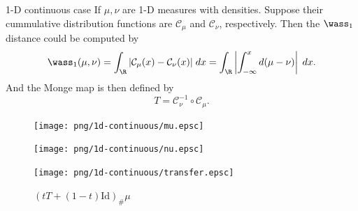 \begin{frame}{1-D continuous case}
    \footnotesize
    \vspace{-.5em}
    If $\mu,\nu$ are 1-D measures with densities. Suppose their 
    cummulative distribution functions are $\mathcal{C}_\mu$ and $\mathcal{C}_\nu$, respectively.
    Then the $\wass_1$ distance could be computed by
    \begin{equation}
        \wass_1(\mu,\nu) = \int_\R |\mathcal{C}_\mu(x)-\mathcal{C}_\nu(x)|\;dx
        = \int_\R \left|\int_{-\infty}^x d(\mu-\nu)\right|\; dx.
    \end{equation}
    And the Monge map is then defined by
    \begin{equation}
        T = \mathcal{C}_\nu^{-1}\circ \mathcal{C}_\mu.
    \end{equation}
    \begin{figure}
        \captionsetup{font=scriptsize}
        \begin{minipage}[c]{0.32\linewidth}
            \vspace{0pt}
            \centering
            \texttt{[image: png/1d-continuous/mu.epsc]}
            \caption*{$\mu$}
        \end{minipage}
        \hfill
        \begin{minipage}[c]{0.32\linewidth}
            \vspace{0pt}
            \centering
            \texttt{[image: png/1d-continuous/nu.epsc]}
            \caption*{$\nu$}
        \end{minipage}
        \hfill
        \begin{minipage}[c]{0.32\linewidth}
            \vspace{0pt}
            \centering
            \texttt{[image: png/1d-continuous/transfer.epsc]}
            \caption*{$(tT+(1-t)\text{Id})_\#\mu$}
        \end{minipage}
    \end{figure}


\end{frame}
